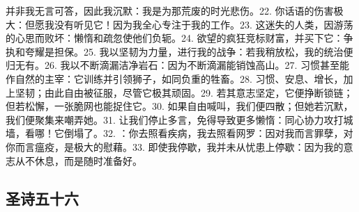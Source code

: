 并非我无言可答，因此我沉默：我是为那荒废的时光悲伤。\newline{}22. 你话语的伤害极大：但愿我没有听见它！因为我全心专注于我的工作。\newline{}23. 这迷失的人类，因游荡的心思而败坏：懒惰和疏忽使他们负轭。\newline{}24. 欲望的疯狂竞标财富，并买下它：争执和夸耀是担保。\newline{}25. 我以坚韧为力量，进行我的战争：若我稍放松，我的统治便归无有。\newline{}26. 我以不断滴漏洁净岩石：因为不断滴漏能销蚀高山。\newline{}27. 习惯甚至能作自然的主宰：它训练并引领狮子，如同负重的牲畜。\newline{}28. 习惯、安息、增长，加上坚韧；由此自由被征服，尽管它极其顽固。\newline{}29. 若其意志坚定，它便挣断锁链；但若松懈，一张脆网也能捉住它。\newline{}30. 如果自由喊叫，我们便四散；但她若沉默，我们便聚集来嘲弄她。\newline{}31. 让我们停止多言，免得导致更多懒惰：同心协力攻打城墙，看哪！它倒塌了。\newline{}32. ：你去照看疾病，我去照看网罗：因对我而言罪孽，对你而言瘟疫，是极大的慰藉。\newline{}33. 即使我停歇，我并未从忧患上停歇：因为我的意志从不休息，而是随时准备好。\par


\subsection{圣诗五十六}

